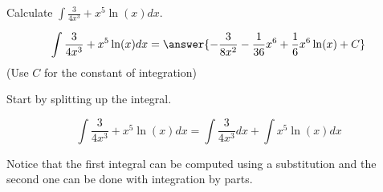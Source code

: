 \documentclass{ximera}
\author{Jim Talamo}
\begin{document}
\begin{exercise}
Calculate $\int \frac{3}{4x^3} + x^5 \ln(x) dx $.


\[
\int  \frac{3}{4x^3} + x^5 \ln(x) dx = \answer{-\frac{3}{8x^2}-\frac{1}{36}x^6+\frac{1}{6}x^6\ln(x) + C } 
\]
(Use $C$ for the constant of integration)

\begin{hint}
Start by splitting up the integral.

\[
\int \frac{3}{4x^3} + x^5 \ln(x) dx  = \int \frac{3}{4x^3}  dx + \int x^5 \ln(x) dx 
\]

Notice that the first integral can be computed using a substitution and the second one can be done with integration by parts.

\end{hint}

\end{exercise}
\end{document}
